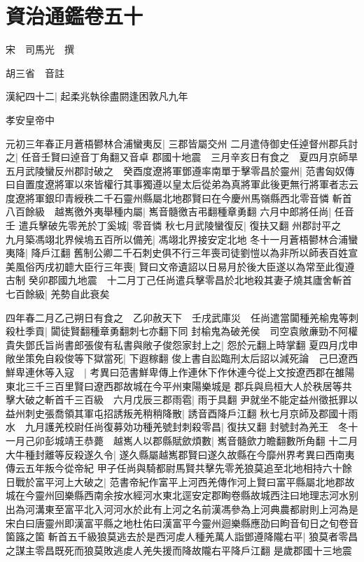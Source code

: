\chapter{資治通鑑卷五十}
宋　司馬光　撰

胡三省　音註

漢紀四十二|{
	起柔兆執徐盡閼逢困敦凡九年}


孝安皇帝中

元初三年春正月蒼梧鬰林合浦蠻夷反|{
	三郡皆屬交州}
二月遣侍御史任逴督州郡兵討之|{
	任音壬賢曰逴音丁角翻又音卓}
郡國十地震　三月辛亥日有食之　夏四月京師旱五月武陵蠻反州郡討破之　癸酉度遼將軍鄧遵率南單于擊零昌於靈州|{
	范書匈奴傳曰自置度遼將軍以來皆權行其事獨遵以皇太后從弟為真將軍此後更無行將軍者志云度遼將軍銀印青綬秩二千石靈州縣屬北地郡賢曰在今慶州馬嶺縣西北零音憐}
斬首八百餘級　越嶲徼外夷舉種内屬|{
	嶲音髓徼吉弔翻種章勇翻}
六月中郎將任尚|{
	任音壬}
遣兵擊破先零羌於丁奚城|{
	零音憐}
秋七月武陵蠻復反|{
	復扶又翻}
州郡討平之　九月築馮翊北界候塢五百所以備羌|{
	馮翊北界接安定北地}
冬十一月蒼梧鬰林合浦蠻夷降|{
	降戶江翻}
舊制公卿二千石刺史俱不行三年喪司徒劉愷以為非所以師表百姓宣美風俗丙戌初聼大臣行三年喪|{
	賢曰文帝遺詔以日易月於後大臣遂以為常至此復遵古制}
癸卯郡國九地震　十二月丁己任尚遣兵擊零昌於北地殺其妻子燒其廬舍斬首七百餘級|{
	羌勢自此衰矣}


四年春二月乙己朔日有食之　乙卯赦天下　壬戌武庫災　任尚遣當闐種羌榆鬼等刺殺杜季貢|{
	闐徒賢翻種章勇翻刺七亦翻下同}
封榆鬼為破羌侯　司空袁敞亷勁不阿權貴失鄧氏旨尚書郎張俊有私書與敞子俊怨家封上之|{
	怨於元翻上時掌翻}
夏四月戊申敞坐策免自殺俊等下獄當死|{
	下遐稼翻}
俊上書自訟臨刑太后詔以減死論　己巳遼西鮮卑連休等入寇　|{
	考異曰范書鮮卑傳上作連休下作休連今從上文按遼西郡在雒陽東北三千三百里賢曰遼西郡故城在今平州東陽樂城是}
郡兵與烏桓大人於秩居等共擊大破之斬首千三百級　六月戊辰三郡雨雹|{
	雨于具翻}
尹就坐不能定益州徵扺罪以益州刺史張喬領其軍屯招誘叛羌稍稍降散|{
	誘音酉降戶江翻}
秋七月京師及郡國十雨水　九月護羌校尉任尚復募効功種羌號封刺殺零昌|{
	復扶又翻}
封號封為羌王　冬十一月己卯彭城靖王恭薨　越嶲人以郡縣賦歛煩數|{
	嶲音髓歛力瞻翻數所角翻}
十二月大牛種封離等反殺遂久令|{
	遂久縣屬越嶲郡賢曰遂久故縣在今靡州界考異曰西南夷傳云五年叛今從帝紀}
甲子任尚與騎都尉馬賢共擊先零羌狼莫追至北地相持六十餘日戰於富平河上大破之|{
	范書帝紀作富平上河西羌傳作河上賢曰富平縣屬北地郡故城在今靈州回樂縣西南余按水經河水東北逕安定郡眴卷縣故城西注曰地理志河水别出為河溝東至富平北入河河水於此有上河之名前漢馮參為上河典農都尉則上河為是宋白曰唐靈州即漢富平縣之地杜佑曰漢富平今靈州迴樂縣應劭曰眗音旬日之旬卷音箘簬之箘}
斬首五千級狼莫逃去於是西河䖍人種羌萬人詣鄧遵降隴右平|{
	狼莫者零昌之謀主零昌既死而狼莫敗逃䖍人羌失援而降故隴右平降戶江翻}
是歲郡國十三地震

